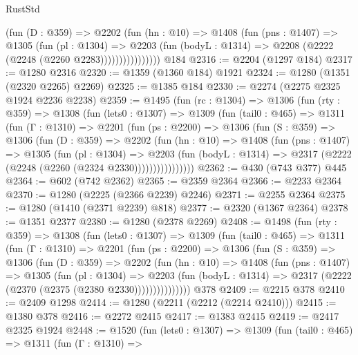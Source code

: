 \begin{lexlean}{RustStd}
\begin{coremodule}
{\begin{coremodule}
{{{{{{{{{{{{                    (fun (D : @359) =>
                    @2202
                      (fun (hn : @10) =>
                      @1408
                        (fun (pns : @1407) =>
                        @1305
                          (fun (pl : @1304) =>
                          @2203
                            (fun (bodyL : @1314) => @2208 (@2222 (@2248 (@2260 @2283))))))))))))))))
    @184
@2316 := @2204 (@1297 @184)
@2317 := @1280 @2316
@2320 := @1359 (@1360 @184) @1921
@2324 := @1280 (@1351 (@2320 @2265) @2269)
@2325 := @1385 @184
@2330 := @2274 (@2275 @2325 @1924 @2236 @2238)
@2359 := @1495
    (fun (rc : @1304) =>
    @1306
      (fun (rty : @359) =>
      @1308
        (fun (lets0 : @1307) =>
        @1309
          (fun (tail0 : @465) =>
          @1311
            (fun (Γ : @1310) =>
            @2201
              (fun (ps : @2200) =>
              @1306
                (fun (S : @359) =>
                @1306
                  (fun (D : @359) =>
                  @2202
                    (fun (hn : @10) =>
                    @1408
                      (fun (pns : @1407) =>
                      @1305
                        (fun (pl : @1304) =>
                        @2203
                          (fun (bodyL : @1314) =>
                          @2317 (@2222 (@2248 (@2260 (@2324 @2330))))))))))))))))
@2362 := @430 (@743 @377) @445
@2364 := @602 (@742 @2362)
@2365 := @2359 @2364
@2366 := @2233 @2364
@2370 := @1280 (@2225 (@2366 @2239) @2246)
@2371 := @2255 @2364
@2375 := @1280 (@1410 (@2371 @2239) @818)
@2377 := @2320 (@1367 @2364)
@2378 := @1351 @2377
@2380 := @1280 (@2378 @2269)
@2408 := @1498
    (fun (rty : @359) =>
    @1308
      (fun (lets0 : @1307) =>
      @1309
        (fun (tail0 : @465) =>
        @1311
          (fun (Γ : @1310) =>
          @2201
            (fun (ps : @2200) =>
            @1306
              (fun (S : @359) =>
              @1306
                (fun (D : @359) =>
                @2202
                  (fun (hn : @10) =>
                  @1408
                    (fun (pns : @1407) =>
                    @1305
                      (fun (pl : @1304) =>
                      @2203
                        (fun (bodyL : @1314) =>
                        @2317 (@2222 (@2370 (@2375 (@2380 @2330)))))))))))))))
    @378
@2409 := @2215 @378
@2410 := @2409 @1298
@2414 := @1280 (@2211 (@2212 (@2214 @2410)))
@2415 := @1380 @378
@2416 := @2272 @2415
@2417 := @1383 @2415
@2419 := @2417 @2325 @1924
@2448 := @1520
    (fun (lets0 : @1307) =>
    @1309
      (fun (tail0 : @465) =>
      @1311
        (fun (Γ : @1310) =>
}}}}}}}}}}}}
\end{coremodule}}
\end{coremodule}
\end{lexlean}
